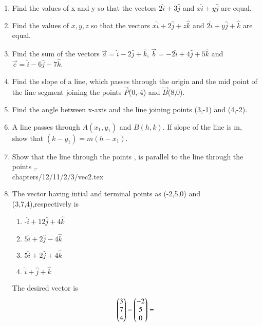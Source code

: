 \begin{enumerate}[label=\thesubsection.\arabic*,ref=\thesubsection.\theenumi]
	\item 		Find the values of x and y so that the vectors
$2\hat{i}+3\hat{j}$
and 
$x\hat{i}+y\hat{j}$
are equal.
\\
\solution

\item Find the values of $x,y,z$ so that the vectors 
$x\hat{i}+2\hat{j}+z\hat{k}$
and 
$2\hat{i}+y\hat{j}+\hat{k}$
are equal.
\item Find the sum of the vectors $\vec{a}=\hat{i}-2\hat{j}+\hat{k}$, $\vec{b}=-2\hat{i}+4\hat{j}+5\hat{k}$ and $\vec{c}=\hat{i}-6\hat{j}-7\hat{k}$.
\item Find the slope of a line, which passes through the origin and the mid point of the line segment joining the points $\vec{P}$(0,-4) and $\vec{B}$(8,0).
\label{chapters/11/10/1/5}
	\\
	\solution

\item Find the angle between x-axis and the line joining points (3,-1) and (4,-2).
\label{chapters/11/10/1/10}
\\
\solution 

\item A line passes through $A(x_1,y_1)$ and $B(h,k)$. If slope of the line is m, show that $(k-y_1)=m(h-x_1)$.
\label{chapters/11/10/1/12}
\\
\solution 

\item
Show that the line through the points , is parallel to the line through the points ,.
	\label{12.11.2.3}
\\
\solution
	 {chapters/12/11/2/3/vec2.tex}
\item The vector having intial and terminal points as (-2,5,0) and (3,7,4),respectively is
	\begin{enumerate}
\item -$\hat{i}+12\hat{j}+4\hat{k}$
\item $5\hat{i}+2\hat{j}-4\hat{k}$
\item $5\hat{i}+2\hat{j}+4\hat{k}$
\item $\hat{i}+\hat{j}+\hat{k}$
\end{enumerate}
\solution
The desired vector is
\begin{align}
	\myvec{3 \\ 7 \\ 4}
	-\myvec{-2 \\ 5 \\ 0} = 

\end{align}
\end{enumerate}
